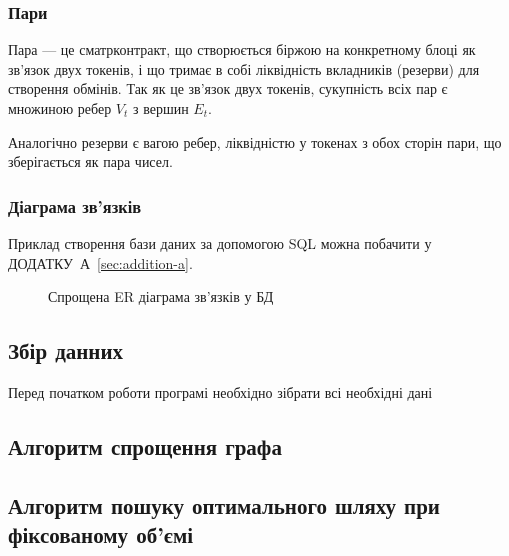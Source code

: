 \documentclass[14pt]{extarticle}
\begin{document}
\subsubsection{Пари}

Пара --- це сматрконтракт, що створюється біржою на конкретному блоці як зв'язок
двух токенів, і що тримає в собі ліквідність вкладників (резерви) для створення
обмінів. Так як це зв'язок двух токенів, сукупність всіх пар є множиною ребер
$V_{t}$ з вершин $E_{t}$.

Аналогічно резерви є вагою ребер, ліквідністю у токенах з обох сторін пари, що
зберігається як пара чисел.

\subsubsection{Діаграма зв'язків}

Приклад створення бази даних за допомогою SQL можна побачити у
ДОДАТКУ~А~\ref{sec:addition-a}.

\begin{figure}[ht]
  \centering
  \caption{\label{fig:label}Спрощена ER діаграма зв'язків у БД}
\end{figure}

\subsection{Збір данних}

Перед початком роботи програмі необхідно зібрати всі необхідні дані

\subsection{Алгоритм спрощення графа}

\subsection{Алгоритм пошуку оптимального шляху при фіксованому об'ємі}
\end{document}
